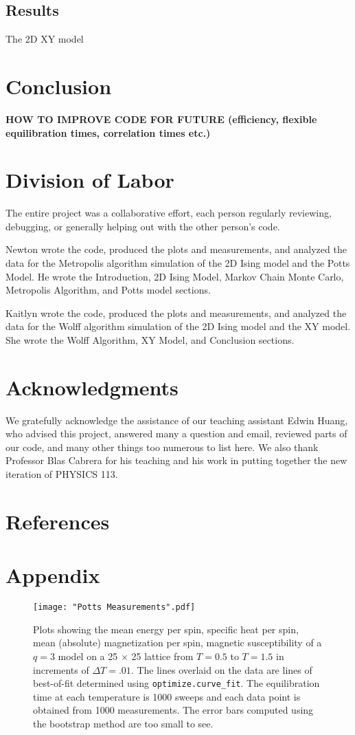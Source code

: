 \documentclass[twocolumn,aps,prl]{revtex4-1} %
\begin{document}
\subsection{Results}

The 2D XY model


\section{Conclusion}
\textbf{HOW TO IMPROVE CODE FOR FUTURE (efficiency, flexible equilibration times, correlation times etc.)}

\section{Division of Labor}
The entire project was a collaborative effort, each person regularly reviewing, debugging, or generally helping out with the other person's code.

Newton wrote the code, produced the plots and measurements, and analyzed the data for the Metropolis algorithm simulation of the 2D Ising model and the Potts Model. He wrote the Introduction, 2D Ising Model, Markov Chain Monte Carlo, Metropolis Algorithm, and Potts model sections.

Kaitlyn wrote the code, produced the plots and measurements, and analyzed the data for the Wolff algorithm simulation of the 2D Ising model and the XY model. She wrote the Wolff Algorithm, XY Model, and Conclusion sections.




\section{Acknowledgments}
We gratefully acknowledge the assistance of our teaching assistant Edwin Huang, who advised this project, answered many a question and email, reviewed parts of our code, and many other things too numerous to list here. We also thank Professor Blas Cabrera for his teaching and his work in putting together the new iteration of PHYSICS 113.

\section{References}


\section{Appendix}
\begin{figure*}
	\texttt{[image: "Potts Measurements".pdf]}
	\caption{\label{fig:q3potts}Plots showing the mean energy per spin, specific heat per spin, mean (absolute) magnetization per spin, magnetic susceptibility of a $q=3$ model on a 25 $\times$ 25 lattice from $T = 0.5$ to $T = 1.5$ in increments of $\Delta T = .01$. The lines overlaid on the data are lines of best-of-fit determined using \texttt{optimize.curve\_fit}. The equilibration time at each temperature is 1000 sweeps and each data point is obtained from 1000 measurements. The error bars computed using the bootstrap method are too small to see.}
\end{figure*}
\end{document}
